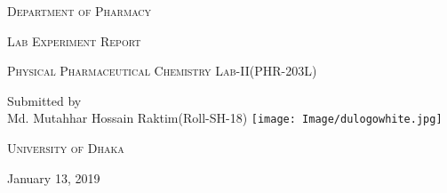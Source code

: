 \documentclass[a4paper,12pt]{article}
\begin{document}
\begin{titlepage}
\centering
{\scshape\LARGE Department of Pharmacy\par}
\vfill
{\scshape\Large Lab Experiment Report\par}
{\scshape\Large Physical Pharmaceutical Chemistry Lab-II(PHR-203L)\par}
\vfill
{\Large Submitted by\\
\vspace{0.5cm}
 \centering Md. Mutahhar Hossain Raktim(Roll-SH-18)}
\vfill
\vfill
  \texttt{[image: Image/dulogowhite.jpg]}\\
{\scshape\LARGE University of Dhaka \par}
\vfill
{\large January 13, 2019\par}
\end{titlepage}
\end{document}
